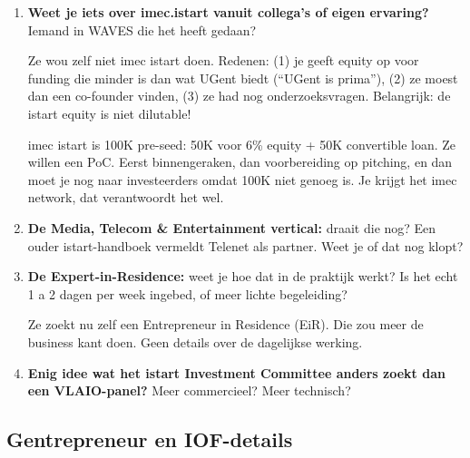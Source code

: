 \documentclass[11pt,a4paper]{article}
\newcommand{\notebox}{%
\begin{tcolorbox}[colback=notebg, colframe=noteborder, boxrule=0.5pt, arc=2pt, left=4pt, right=4pt, top=2pt, bottom=2pt]
\vspace{2.2cm}
\end{tcolorbox}
}
\newcommand{\filledbox}[1]{%
\begin{tcolorbox}[colback=notebg, colframe=noteborder, boxrule=0.5pt, arc=2pt, left=4pt, right=4pt, top=2pt, bottom=2pt]
#1
\end{tcolorbox}
}
\begin{document}
\begin{enumerate}[resume]

\item \textbf{Weet je iets over imec.istart vanuit collega's of eigen ervaring?} Iemand in WAVES die het heeft gedaan?

\filledbox{Ze wou zelf niet imec istart doen. Redenen: (1) je geeft equity op voor funding die minder is dan wat UGent biedt (``UGent is prima''), (2) ze moest dan een co-founder vinden, (3) ze had nog onderzoeksvragen. Belangrijk: de istart equity is niet dilutable!

imec istart is 100K pre-seed: 50K voor 6\% equity + 50K convertible loan. Ze willen een PoC. Eerst binnengeraken, dan voorbereiding op pitching, en dan moet je nog naar investeerders omdat 100K niet genoeg is. Je krijgt het imec network, dat verantwoordt het wel.}

\item \textbf{De Media, Telecom \& Entertainment vertical:} draait die nog? Een ouder istart-handboek vermeldt Telenet als partner. Weet je of dat nog klopt?

\notebox

\item \textbf{De Expert-in-Residence:} weet je hoe dat in de praktijk werkt? Is het echt 1 a 2 dagen per week ingebed, of meer lichte begeleiding?

\filledbox{Ze zoekt nu zelf een Entrepreneur in Residence (EiR). Die zou meer de business kant doen. Geen details over de dagelijkse werking.}

\item \textbf{Enig idee wat het istart Investment Committee anders zoekt dan een VLAIO-panel?} Meer commercieel? Meer technisch?

\notebox

\end{enumerate}

\subsection{Gentrepreneur en IOF-details}
\end{document}
